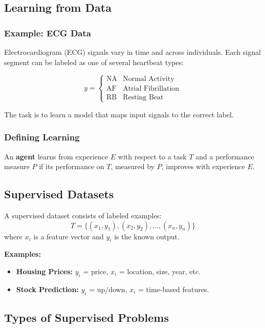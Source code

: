 \subsection{Learning from Data}

\subsubsection{Example: ECG Data}

Electrocardiogram (ECG) signals vary in time and across individuals. Each signal segment can be labeled as one of several heartbeat types:

\[
y =
\begin{cases}
\text{NA} & \text{Normal Activity}\\
\text{AF} & \text{Atrial Fibrillation}\\
\text{RB} & \text{Resting Beat}
\end{cases}
\]

The task is to learn a model that maps input signals to the correct label.

\subsubsection{Defining Learning}

An \textbf{agent} learns from experience $E$ with respect to a task $T$ and a performance measure $P$ if its performance on $T$, measured by $P$, improves with experience $E$.

\subsection{Supervised Datasets}

A supervised dataset consists of labeled examples:
\[
T = \{(x_1, y_1), (x_2, y_2), \dots, (x_n, y_n)\}
\]
where $x_i$ is a feature vector and $y_i$ is the known output.

\textbf{Examples:}
\begin{itemize}
    \item \textbf{Housing Prices:} $y_i$ = price, $x_i$ = location, size, year, etc.
    \item \textbf{Stock Prediction:} $y_i$ = up/down, $x_i$ = time-based features.
\end{itemize}

\subsection{Types of Supervised Problems}

